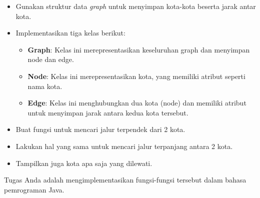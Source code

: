 \begin{itemize}
	\item Gunakan struktur data \textit{graph} untuk menyimpan kota-kota beserta jarak antar kota.
	\item Implementasikan tiga kelas berikut:
	\begin{itemize}
		\item \textbf{Graph}: Kelas ini merepresentasikan keseluruhan graph dan menyimpan node dan edge.
		\item \textbf{Node}: Kelas ini merepresentasikan kota, yang memiliki atribut seperti nama kota.
		\item \textbf{Edge}: Kelas ini menghubungkan dua kota (node) dan memiliki atribut untuk menyimpan jarak antara kedua kota tersebut.
	\end{itemize}
	\item Buat fungsi untuk mencari jalur terpendek dari 2 kota.
	\item Lakukan hal yang sama untuk mencari jalur terpanjang antara 2 kota.
	\item Tampilkan juga kota apa saja yang dilewati.
\end{itemize}

Tugas Anda adalah mengimplementasikan fungsi-fungsi tersebut dalam bahasa pemrograman Java.

